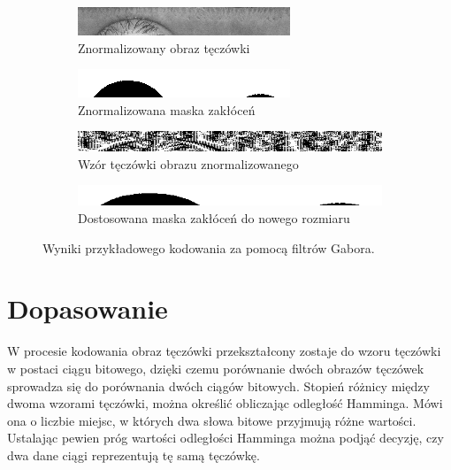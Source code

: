 \begin{figure}
  \centering
  \begin{subfigure}[b]{0.5\textwidth}
    \includegraphics[width=\textwidth]{images/encoding/norm.png}
    \caption{Znormalizowany obraz tęczówki}
  \end{subfigure}
  \begin{subfigure}[b]{0.5\textwidth}
    \includegraphics[width=\textwidth]{images/encoding/normMask.png}
    \caption{Znormalizowana maska zakłóceń}
  \end{subfigure}
  \begin{subfigure}[b]{1\textwidth}
    \includegraphics[width=\textwidth]{images/encoding/encoded.png}
    \caption{Wzór tęczówki obrazu znormalizowanego}
  \end{subfigure}
  \begin{subfigure}[b]{\textwidth}
    \includegraphics[width=\textwidth]{images/encoding/encodedMask.png}
    \caption{Dostosowana maska zakłóceń do nowego rozmiaru}
  \end{subfigure}
  \caption{Wyniki przykładowego kodowania za pomocą filtrów Gabora.}
  \label{fig:gaborExample}
\end{figure}

\section{Dopasowanie}

W procesie kodowania obraz tęczówki przekształcony zostaje do wzoru tęczówki w postaci ciągu bitowego,
dzięki czemu porównanie dwóch obrazów tęczówek sprowadza się do porównania dwóch ciągów bitowych.
Stopień różnicy między dwoma wzorami tęczówki, można określi\'c obliczając odległoś\'c Hamminga. Mówi
ona o liczbie miejsc, w których dwa słowa bitowe przyjmują różne wartości.
Ustalając pewien próg wartości odległości Hamminga można podją\'c decyzję, czy dwa dane ciągi
reprezentują tę samą tęczówkę.

